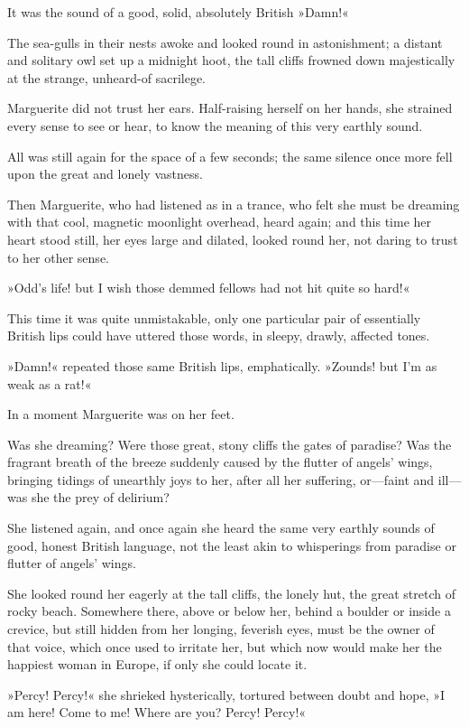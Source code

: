 It was the sound of a good, solid, absolutely British »Damn!«

The sea-gulls in their nests awoke and looked round in astonishment; a distant and solitary owl set up a midnight hoot, the tall cliffs frowned down majestically at the strange, unheard-of sacrilege.

Marguerite did not trust her ears. Half-raising herself on her hands, she strained every sense to see or hear, to know the meaning of this very earthly sound.

All was still again for the space of a few seconds; the same silence once more fell upon the great and lonely vastness.

Then Marguerite, who had listened as in a trance, who felt she must be dreaming with that cool, magnetic moonlight overhead, heard again; and this time her heart stood still, her eyes large and dilated, looked round her, not daring to trust to her other sense.

»Odd's life! but I wish those demmed fellows had not hit quite so hard!«

This time it was quite unmistakable, only one particular pair of essentially British lips could have uttered those words, in sleepy, drawly, affected tones.

»Damn!« repeated those same British lips, emphatically. »Zounds! but I'm as weak as a rat!«

In a moment Marguerite was on her feet.

Was she dreaming? Were those great, stony cliffs the gates of paradise? Was the fragrant breath of the breeze suddenly caused by the flutter of angels' wings, bringing tidings of unearthly joys to her, after all her suffering, or—faint and ill—was she the prey of delirium?

She listened again, and once again she heard the same very earthly sounds of good, honest British language, not the least akin to whisperings from paradise or flutter of angels' wings.

She looked round her eagerly at the tall cliffs, the lonely hut, the great stretch of rocky beach. Somewhere there, above or below her, behind a boulder or inside a crevice, but still hidden from her longing, feverish eyes, must be the owner of that voice, which once used to irritate her, but which now would make her the happiest woman in Europe, if only she could locate it.

»Percy! Percy!« she shrieked hysterically, tortured between doubt and hope, »I am here! Come to me! Where are you? Percy! Percy!\textellipsis«

